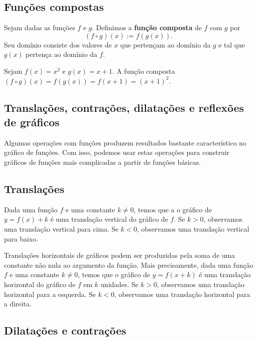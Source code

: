 \subsection{Funções compostas}

Sejam dadas as funções $f$ e $g$. Definimos a {\bf função composta} de $f$ com $g$ por
\begin{equation}
  (f\circ g)(x) := f(g(x)).
\end{equation}
Seu domínio consiste dos valores de $x$ que pertençam ao domínio da $g$ e tal que $g(x)$ pertença ao domínio da $f$.

\begin{ex}
  Sejam $f(x) = x^2$ e $g(x) = x+1$. A função composta $(f\circ g)(x) = f(g(x)) = f(x+1) = (x+1)^2$.
\end{ex}

\subsection{Translações, contrações, dilatações e reflexões de gráficos}

Algumas operações com funções produzem resultados bastante característico no gráfico de funções. Com isso, podemos usar estas operações para construir gráficos de funções mais complicadas a partir de funções básicas.

\subsection{Translações}

Dada uma função $f$ e uma constante $k\neq 0$, temos que a o gráfico de $y = f(x) + k$ é uma translação vertical do gráfico de $f$. Se $k>0$, observamos uma translação vertical para cima. Se $k<0$, observamos uma translação vertical para baixo.

Translações horizontais de gráficos podem ser produzidas pela soma de uma constante não nula ao argumento da função. Mais precisamente, dada uma função $f$ e uma constante $k\neq 0$, temos que o gráfico de $y=f(x+k)$ é uma translação horizontal do gráfico de $f$ em $k$ unidades. Se $k>0$, observamos uma translação horizontal para a esquerda. Se $k<0$, observamos uma translação horizontal para a direita.

\subsection{Dilatações e contrações}

